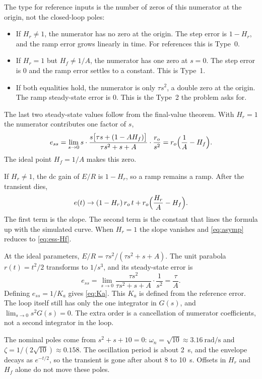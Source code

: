 \documentclass[12pt,a4paper]{article}
\begin{document}
The type for reference inputs is the number of zeros of this numerator at the origin, not the closed-loop poles:
\begin{itemize}
  \item If \(H_r\neq 1\), the numerator has no zero at the origin. The step error is \(1-H_r\), and the ramp error grows linearly in time. For references this is Type~0.
  \item If \(H_r=1\) but \(H_f\neq 1/A\), the numerator has one zero at \(s=0\). The step error is 0 and the ramp error settles to a constant. This is Type~1.
  \item If both equalities hold, the numerator is only \(\tau s^2\), a double zero at the origin. The ramp steady-state error is 0. This is the Type~2 the problem asks for.
\end{itemize}

The last two steady-state values follow from the final-value theorem. With \(H_r=1\) the numerator contributes one factor of \(s\),
\begin{equation}
  e_{ss}
  =\lim_{s\to 0}s\cdot\frac{s\bigl[\tau s+(1-A H_f)\bigr]}{\tau s^2+s+A}\cdot\frac{r_o}{s^2}
  =r_o\Bigl(\frac{1}{A}-H_f\Bigr).
  \label{eq:ess-Hf}
\end{equation}
The ideal point \(H_f=1/A\) makes this zero.

If \(H_r\neq 1\), the dc gain of \(E/R\) is \(1-H_r\), so a ramp remains a ramp. After the transient dies,
\begin{equation}
  e(t)\to (1-H_r)\,r_o\, t+r_o\Bigl(\frac{H_r}{A}-H_f\Bigr).
  \label{eq:asymp}
\end{equation}
The first term is the slope. The second term is the constant that lines the formula up with the simulated curve.
When \(H_r=1\) the slope vanishes and \eqref{eq:asymp} reduces to \eqref{eq:ess-Hf}.

At the ideal parameters, \(E/R=\tau s^2/(\tau s^2+s+A)\).
The unit parabola \(r(t)=t^2/2\) transforms to \(1/s^3\), and its steady-state error is
\[
  e_{ss}
  =\lim_{s\to 0}
   \frac{\tau s^2}{\tau s^2+s+A}\cdot\frac{1}{s^2}
  =\frac{\tau}{A}.
\]
Defining \(e_{ss}=1/K_a\) gives \eqref{eq:Ka}.
This \(K_a\) is defined from the reference error. The loop itself still has only the one integrator in \(G(s)\), and \(\lim_{s\to 0}s^2 G(s)=0\).
The extra order is a cancellation of numerator coefficients, not a second integrator in the loop.

The nominal poles come from \(s^2+s+10=0\): \(\omega_n=\sqrt{10}\approx 3.16~\mathrm{rad/s}\) and \(\zeta=1/(2\sqrt{10})\approx 0.158\).
The oscillation period is about 2~s, and the envelope decays as \(e^{-t/2}\), so the transient is gone after about 8 to 10~s.
Offsets in \(H_r\) and \(H_f\) alone do not move these poles.
\end{document}
